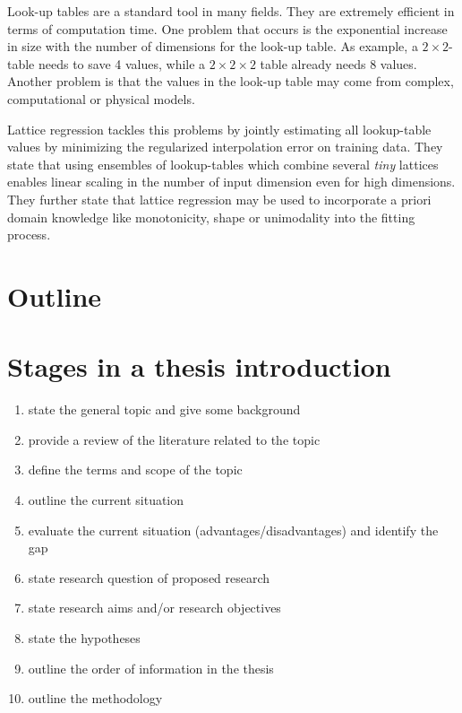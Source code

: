 \documentclass[10pt,a4paper]{article}
\begin{document}
Look-up tables are a standard tool in many fields. They are extremely efficient in terms of computation time. One problem that occurs is the exponential increase in size with the number of dimensions for the look-up table. As example, a $2 \times 2$-table needs to save 4 values, while a $2 \times 2 \times 2$ table already needs 8 values. Another problem is that the values in the look-up table may come from complex, computational or physical models. 

Lattice regression tackles this problems by jointly estimating all lookup-table values by minimizing the regularized interpolation error on training data. \cite{garcia2009lattice} They state that using ensembles of lookup-tables which combine several \emph{tiny} lattices enables linear scaling in the number of input dimension even for high dimensions. \cite{fard2016fast} They further state that lattice regression may be used to incorporate a priori domain knowledge like monotonicity, shape or unimodality into the fitting process. \cite{gupta2016monotonic} \cite{you2017deep}

\section{Outline}





\section{Stages in a thesis introduction}

\begin{enumerate}
	\color{OliveGreen}
	\item state the general topic and give some background
	\item provide a review of the literature related to the topic
	\item define the terms and scope of the topic
	\color{Red}
	\item outline the current situation
	\item evaluate the current situation (advantages/disadvantages) and identify the gap
	\color{Mahogany}
	\item state research question of proposed research
	\item state research aims and/or research objectives
	\item state the hypotheses
	\item outline the order of information in the thesis
	\item outline the methodology
	
\end{enumerate}
\end{document}
